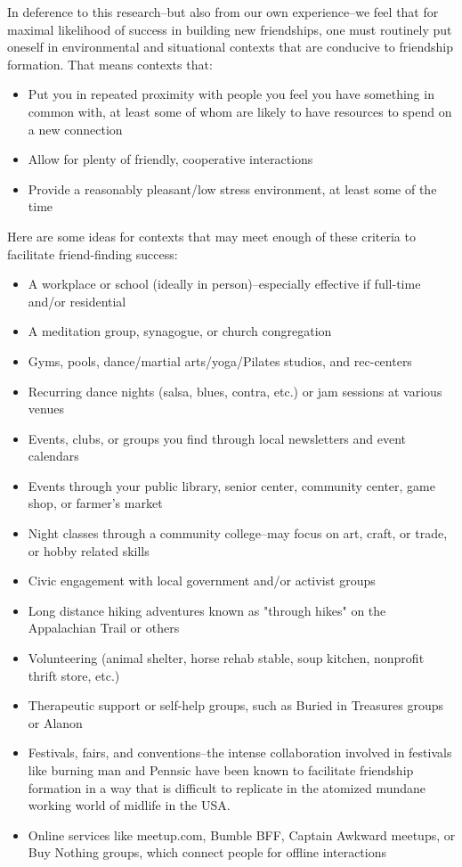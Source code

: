\documentclass[12pt,letterpaper]{book}
\begin{document}
In deference to this research–but also from our own experience–we feel that for maximal likelihood of success in building new friendships, one must routinely put oneself in environmental and situational contexts that are conducive to friendship formation. That means contexts that:
\begin{itemize}
	\item Put you in repeated proximity with people you feel you have something in common with, at least some of whom are likely to have resources to spend on a new connection
	\item Allow for plenty of friendly, cooperative interactions
	\item Provide a reasonably pleasant/low stress environment, at least some of the time
\end{itemize}

Here are some ideas for contexts that may meet enough of these criteria to facilitate friend-finding success:
\begin{itemize}
	\item A workplace or school (ideally in person)–especially effective if full-time and/or residential
	\item A meditation group, synagogue, or church congregation
	\item Gyms, pools, dance/martial arts/yoga/Pilates studios, and rec-centers
	\item Recurring dance nights (salsa, blues, contra, etc.) or jam sessions at various venues
	\item Events, clubs, or groups you find through local newsletters and event calendars
	\item Events through your public library, senior center, community center, game shop, or farmer's market
	\item Night classes through a community college–may focus on art, craft, or trade, or hobby related skills
	\item Civic engagement with local government and/or activist groups
	\item Long distance hiking adventures known as "through hikes" on the Appalachian Trail or others
	\item Volunteering (animal shelter, horse rehab stable, soup kitchen, nonprofit thrift store, etc.)
	\item Therapeutic support or self-help groups, such as Buried in Treasures groups or Alanon
	\item Festivals, fairs, and conventions–the intense collaboration involved in festivals like burning man \cite{st2018civilised} and Pennsic have been known to facilitate friendship formation in a way that is difficult to replicate in the atomized mundane working world of midlife in the USA.
	\item Online services like meetup.com, Bumble BFF, Captain Awkward meetups, or Buy Nothing groups, which connect people for offline interactions
\end{itemize}
\end{document}
